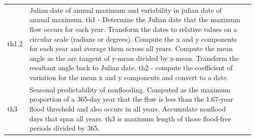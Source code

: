 \documentclass[a4paper,11pt]{article}\usepackage[]{graphicx}\usepackage[]{color}
\begin{document}
\begin{table}[ht]
\begin{threeparttable}[b]
\begin{tabularx}{\textwidth}{lXl}
  th1.2 & Julian date of annual maximum and variability in julian date of annual maximum. th1 - Determine the Julian date that the maximum flow occurs for each year. Transform the dates to relative values on a circular scale (radians or degrees). Compute the x and y components for each year and average them across all years. Compute the mean angle as the arc tangent of y-mean divided by x-mean. Transform the resultant angle back to Julian date. th2 - compute the coefficient of variation for the mean x and y components and convert to a date. \\
  th3 & Seasonal predictability of nonflooding. Computed as the maximum proportion of a 365-day year that the flow is less than the 1.67-year flood threshold and also occurs in all years. Accumulate nonflood days that span all years. th3 is maximum length of those flood-free periods divided by 365. \\
   \hline
\end{tabularx}
\end{threeparttable}
\end{table}
\end{document}
